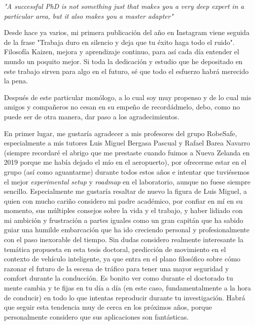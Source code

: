 \begin{center}
	\textit{"A successful PhD is not something just that makes you a very deep expert in a particular area, but it also makes you a master adapter"}
\end{center}

Desde hace ya varios, mi primera publicación del año en Instagram viene seguida de la frase "Trabaja duro en silencio y deja que tu éxito haga todo el ruido". Filosofía Kaizen, mejora y aprendizaje continuo, para así cada día entender el mundo un poquito mejor. Si toda la dedicación y estudio que he depositado en este trabajo sirven para algo en el futuro, sé que todo el esfuerzo habrá merecido la pena.

Después de este particular monólogo, a lo cual soy muy propenso y de lo cual mis amigos y compañeros no cesan en su empeño de recordádmelo, debo, como no puede ser de otra manera, dar paso a los agradecimientos.

En primer lugar, me gustaría agradecer a mis profesores del grupo RobeSafe, especialmente a mis tutores Luis Miguel Bergasa Pascual y Rafael Barea Navarro (siempre recordaré el abrigo que me prestaste cuando fuimos a Nueva Zelanda en 2019 porque me había dejado el mío en el aeropuerto), por ofrecerme estar en el grupo (así como aguantarme) durante todos estos años e intentar que tuviésemos el mejor \textit{experimental setup} y \textit{roadmap} en el laboratorio, aunque no fuese siempre sencillo. Especialmente me gustaría resaltar de nuevo la figura de Luis Miguel, a quien con mucho cariño considero mi padre académico, por confiar en mí en su momento, sus múltiples consejos sobre la vida y el trabajo, y haber lidiado con mi ambición y frustración a partes iguales como un gran capitán que ha sabido guiar una humilde embarcación que ha ido creciendo personal y profesionalmente con el paso inexorable del tiempo. Sin dudas considero realmente interesante la temática propuesta en esta tesis doctoral, predicción de movimiento en el contexto de vehículo inteligente, ya que entra en el plano filosófico sobre cómo razonar el futuro de la escena de tráfico para tener una mayor seguridad y comfort durante la conducción. Es bonito ver como durante el doctorado tu mente cambia y te fijas en tu día a día (en este caso, fundamentalmente a la hora de conducir) en todo lo que intentas reproducir durante tu investigación. Habrá que seguir esta tendencia muy de cerca en los próximos años, porque personalmente considero que sus aplicaciones son fantásticas.

